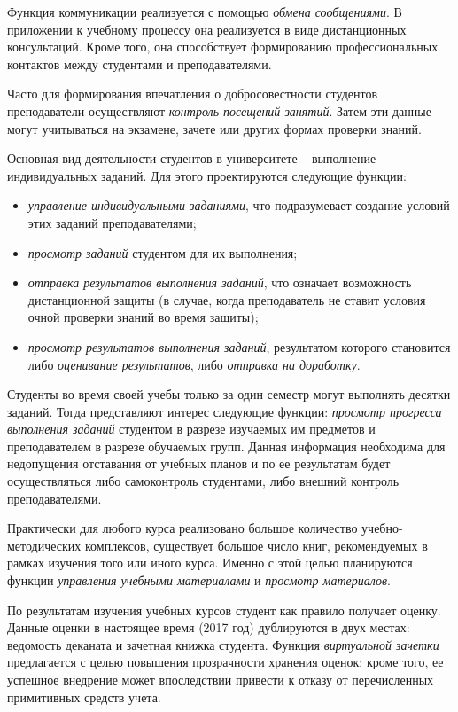 Функция коммуникации реализуется с помощью \emph{обмена сообщениями}. В приложении к учебному процессу она реализуется в виде дистанционных консультаций. Кроме того, она способствует формированию профессиональных контактов между студентами и преподавателями.

Часто для формирования впечатления о добросовестности студентов преподаватели осуществляют \emph{контроль посещений занятий}. Затем эти данные могут учитываться на экзамене, зачете или других формах проверки знаний.

Основная вид деятельности студентов в университете -- выполнение индивидуальных заданий. Для этого проектируются следующие функции:

\begin{itemize}
	\item \emph{управление индивидуальными заданиями}, что подразумевает создание условий этих заданий преподавателями;
	\item \emph{просмотр заданий} студентом для их выполнения;
	\item \emph{отправка результатов выполнения заданий}, что означает возможность дистанционной защиты (в случае, когда преподаватель не ставит условия очной проверки знаний во время защиты);
	\item \emph{просмотр результатов выполнения заданий}, результатом которого становится либо \emph{оценивание результатов}, либо \emph{отправка на доработку}.
\end{itemize}

Студенты во время своей учебы только за один семестр могут выполнять десятки заданий. Тогда представляют интерес следующие функции: \emph{просмотр прогресса выполнения заданий} студентом в разрезе изучаемых им предметов и преподавателем в разрезе обучаемых групп. Данная информация необходима для недопущения отставания от учебных планов и по ее результатам будет осуществляться либо самоконтроль студентами, либо внешний контроль преподавателями.

Практически для любого курса реализовано большое количество учеб\-но-методических комплексов, существует большое число книг, рекомендуемых в рамках изучения того или иного курса. Именно с этой целью планируются функции \emph{управления учебными материалами} и \emph{просмотр материалов}.

По результатам изучения учебных курсов студент как правило получает оценку. Данные оценки в настоящее время (2017 год) дублируются в двух местах: ведомость деканата и зачетная книжка студента. Функция \emph{виртуальной зачетки} предлагается с целью повышения прозрачности хранения оценок; кроме того, ее успешное внедрение может впоследствии привести к отказу от перечисленных примитивных средств учета.

